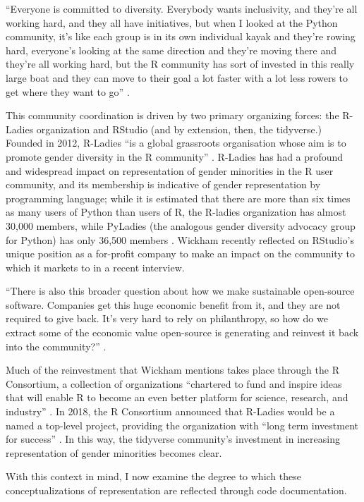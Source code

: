 \begin{displayquote}
``Everyone is committed to diversity. Everybody wants inclusivity, and they're all working hard, and they all have initiatives, but when I looked at the Python community, it's like each group is in its own individual kayak and they're rowing hard, everyone's looking at the same direction and they're moving there and they're all working hard, but the R community has sort of invested in this really large boat and they can move to their goal a lot faster with a lot less rowers to get where they want to go'' \cite{shaikhwomen2019}.
\end{displayquote}

This community coordination is driven by two primary organizing forces: the R-Ladies organization and RStudio (and by extension, then, the tidyverse.) Founded in 2012, R-Ladies ``is a global grassroots organisation whose aim is to promote gender diversity in the R community'' \cite{grieves}. R-Ladies has had a profound and widespread impact on representation of gender minorities in the R user community, and its membership is indicative of gender representation by programming language; while it is estimated that there are more than six times as many users of Python than users of R, the R-ladies organization has almost 30,000 members, while PyLadies (the analogous gender diversity advocacy group for Python) has only 36,500 members \cite{shaikhblog}. Wickham recently reflected on RStudio's unique position as a for-profit company to make an impact on the community to which it markets to in a recent interview.

\begin{displayquote}
``There is also this broader question about how we make sustainable open-source software. Companies get this huge economic benefit from it, and they are not required to give back. It’s very hard to rely on philanthropy, so how do we extract some of the economic value open-source is generating and reinvest it back into the community?'' \cite{future_r_hadley}.
\end{displayquote}

Much of the reinvestment that Wickham mentions takes place through the R Consortium, a collection of organizations ``chartered to fund and inspire ideas that will enable R to become an even better platform for science, research, and industry'' \cite{rstudio_about}. In 2018, the R Consortium announced that R-Ladies would be a named a top-level project, providing the organization with ``long term investment for success'' \cite{mertic_r}. In this way, the tidyverse community's investment in increasing representation of gender minorities becomes clear.

With this context in mind, I now examine the degree to which these conceptualizations of representation are reflected through code documentation.




